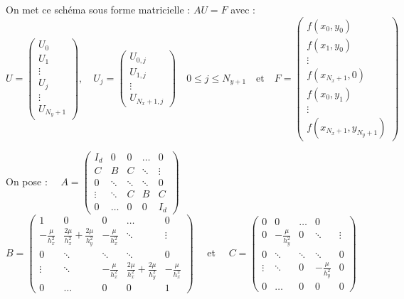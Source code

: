 \documentclass[12pt,a4paper]{article}
\begin{document}
\begin{enumerate}[resume]
    On met ce schéma sous forme matricielle : $AU = F$ avec : \\

    $U = \begin{pmatrix}
        U_0 \\
        U_1 \\
        \vdots \\
        U_j \\
        \vdots \\
        U_{N_y+1}
    \end{pmatrix} , \quad
    U_j = \begin{pmatrix}
        U_{0,j} \\
        U_{1,j} \\
        \vdots \\
        U_{N_x+1,j}
    \end{pmatrix} \quad 0 \leq j \leq N_{y+1} \quad \text{et} \quad
    F = \begin{pmatrix}
        f(x_0, y_0) \\
        f(x_1, y_0) \\
        \vdots \\
        f(x_{N_x+1}, 0) \\
        f(x_0, y_1) \\
        \vdots \\
        f(x_{N_x+1}, y_{N_y+1})
    \end{pmatrix}$

    On pose : $\quad A = \begin{pmatrix}
        I_d & 0 & 0 & \dots & 0 \\
        C & B & C & \ddots & \vdots \\
        0 & \ddots & \ddots & \ddots & 0 \\
        \vdots & \ddots & C & B & C \\
        0 & \dots & 0 & 0 & I_d
    \end{pmatrix}$\\

    $B = \begin{pmatrix}
        1 & 0 & 0 & \dots & 0 \\
        -\frac{\mu}{h_x^2} & \frac{2\mu}{h_x^2} + \frac{2\mu}{h_y^2} & -\frac{\mu}{h_x^2} & \ddots & \vdots \\
        0 & \ddots & \ddots & \ddots & 0 \\
        \vdots & \ddots & -\frac{\mu}{h_x^2} & \frac{2\mu}{h_x^2} + \frac{2\mu}{h_y^2} & -\frac{\mu}{h_x^2} \\
        0 & \dots & 0 & 0 & 1
    \end{pmatrix}\quad$ et 
    $\quad C = \begin{pmatrix}
        0 & 0 & \dots & 0 \\
        0 & -\frac{\mu}{h_y^2} & 0 & \ddots & \vdots \\
        0 & \ddots & \ddots & \ddots & 0 \\
        \vdots & \ddots & 0 & -\frac{\mu}{h_y^2} & 0 \\
        0 & \dots & 0 & 0 & 0
    \end{pmatrix}$\\


\end{enumerate}
\end{document}

